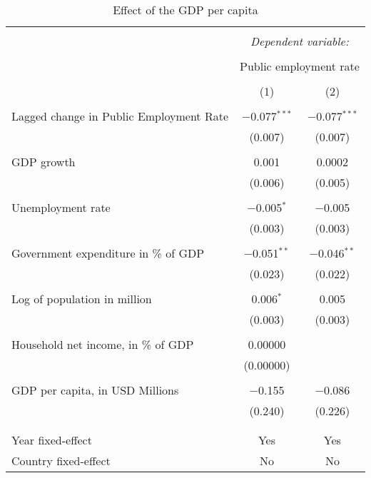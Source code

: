 
\begin{table}[!htbp] \centering 
  \caption{Effect of the GDP per capita} 
  \label{} 
\begin{tabular}{@{\extracolsep{5pt}}lcc} 
\\[-1.8ex]\hline 
\hline \\[-1.8ex] 
 & \multicolumn{2}{c}{\textit{Dependent variable:}} \\ 
\cline{2-3} 
\\[-1.8ex] & \multicolumn{2}{c}{Public employment rate} \\ 
\\[-1.8ex] & (1) & (2)\\ 
\hline \\[-1.8ex] 
 Lagged change in Public Employment Rate & $-$0.077$^{***}$ & $-$0.077$^{***}$ \\ 
  & (0.007) & (0.007) \\ 
  & & \\ 
 GDP growth & 0.001 & 0.0002 \\ 
  & (0.006) & (0.005) \\ 
  & & \\ 
 Unemployment rate & $-$0.005$^{*}$ & $-$0.005 \\ 
  & (0.003) & (0.003) \\ 
  & & \\ 
 Government expenditure in \% of GDP & $-$0.051$^{**}$ & $-$0.046$^{**}$ \\ 
  & (0.023) & (0.022) \\ 
  & & \\ 
 Log of population in million & 0.006$^{*}$ & 0.005 \\ 
  & (0.003) & (0.003) \\ 
  & & \\ 
 Household net income, in \% of GDP & 0.00000 &  \\ 
  & (0.00000) &  \\ 
  & & \\ 
 GDP per capita, in USD Millions & $-$0.155 & $-$0.086 \\ 
  & (0.240) & (0.226) \\ 
  & & \\ 
\hline \\[-1.8ex] 
Year fixed-effect & Yes & Yes \\ 
Country fixed-effect & No & No \\ 

\end{tabular}
\end{table}
